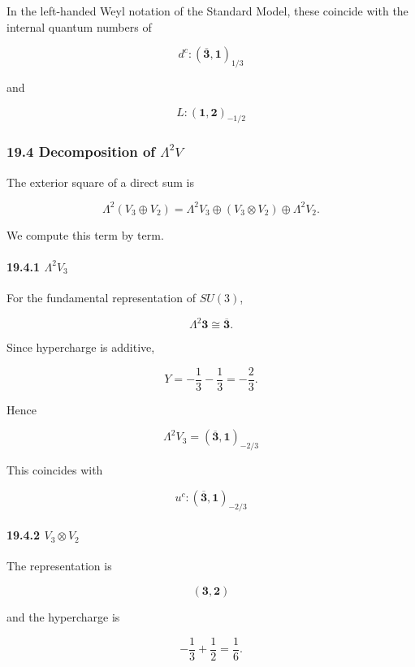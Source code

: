 \documentclass[
  a4paper,
]{article}
\begin{document}
In the left-handed Weyl notation of the Standard Model, these coincide
with the internal quantum numbers of

\[
\boxed{
d^c
:
(\overline{\mathbf3},\mathbf1)_{1/3}
}
\tag{112}
\]

and

\[
\boxed{
L
:
(\mathbf1,\mathbf2)_{-1/2}
}
\tag{113}
\]

\subsubsection{\texorpdfstring{19.4 Decomposition of
\(\Lambda^2V\)}{19.4 Decomposition of \textbackslash Lambda\^{}2V}}\label{decomposition-of-lambda2v}

The exterior square of a direct sum is

\[
\Lambda^2(V_3\oplus V_2)
=
\Lambda^2V_3
\oplus
(V_3\otimes V_2)
\oplus
\Lambda^2V_2.
\tag{114}
\]

We compute this term by term.

\paragraph{\texorpdfstring{19.4.1
\(\Lambda^2V_3\)}{19.4.1 \textbackslash Lambda\^{}2V\_3}}\label{lambda2v_3}

For the fundamental representation of \(SU(3)\),

\[
\Lambda^2\mathbf3
\cong
\overline{\mathbf3}.
\]

Since hypercharge is additive,

\[
Y
=
-\frac13-\frac13
=
-\frac23.
\]

Hence

\[
\boxed{
\Lambda^2V_3
=
(\overline{\mathbf3},\mathbf1)_{-2/3}
}
\tag{115}
\]

This coincides with

\[
\boxed{
u^c
:
(\overline{\mathbf3},\mathbf1)_{-2/3}
}
\tag{116}
\]

\paragraph{\texorpdfstring{19.4.2
\(V_3\otimes V_2\)}{19.4.2 V\_3\textbackslash otimes V\_2}}\label{v_3otimes-v_2}

The representation is

\[
(\mathbf3,\mathbf2)
\]

and the hypercharge is

\[
-\frac13+\frac12
=
\frac16.
\]
\end{document}
